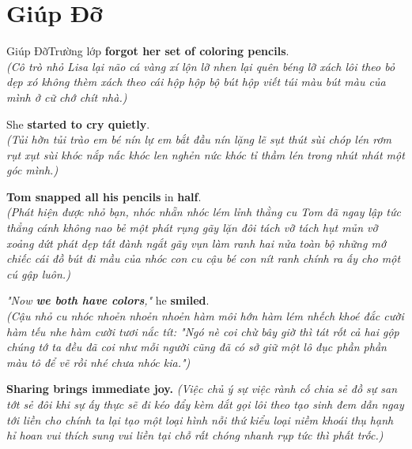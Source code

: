 \vspace{0.8cm}

\ngayDay{}
\section{Giúp Đỡ}
\begin{truyen}{Giúp Đỡ}{Trường lớp}
 \textbf{forgot her set of coloring pencils}.\\
\textit{(Cô trò nhỏ Lisa lại não cá vàng xí lộn lỡ nhen lại quên béng lỡ xách lôi theo bỏ dẹp xó không thèm xách theo cái hộp hộp bộ bút hộp viết túi màu bút màu của mình ở cữ chớ chít nhà.)}

She \textbf{started to cry quietly}.\\
\textit{(Tủi hờn tủi trào em bé nín lự em bắt đầu nín lặng lẽ sụt thút sùi chóp lén rơm rụt xụt sùi khóc nắp nấc khóc len nghẻn nức khóc tỉ thầm lén trong nhút nhát một góc mình.)}

\textbf{Tom snapped all his pencils} in \textbf{half}.\\
\textit{(Phát hiện được nhỏ bạn, nhóc nhẵn nhóc lém lỉnh thằng cu Tom đã ngay lập tức thẳng cánh không nao bẻ một phát rụng gãy lặn đôi tách vỡ tách hụt mủn vỡ xoảng dứt phát dẹp tất đành ngắt gãy vụn làm ranh hai nửa toàn bộ những mớ chiếc cái đồ bút đi mầu của nhóc con cu cậu bé con nít ranh chính ra ấy cho một cú gập luôn.)}

\textit{"Now \textbf{we both have colors},"} he \textbf{smiled}.\\
\textit{(Cậu nhỏ cu nhóc nhoẻn nhoẻn nhoẻn hàm môi hớn hàm lém nhếch khoé đắc cười hàm tếu nhe hàm cười tươi nắc tít: "Ngó nè coi chừ bây giờ thì tát rốt cả hai gộp chúng tớ ta đều đã coi như mỗi người cũng đã có sở giữ một lô đục phần phần màu tô để vẽ rồi nhé chưa nhóc kia.")}
\end{truyen}

\begin{baihoc}
  \textbf{Sharing brings immediate joy.} \textit{(Việc chủ ý sự việc rành cố chia sẻ đồ sự san tớt sẻ đôi khi sự ấy thực sẽ đi kéo đẩy kèm dắt gọi lôi theo tạo sinh đem dẫn ngay tới liền cho chính ta lại tạo một loại hình nỗi thứ kiểu loại niềm khoái thụ hạnh hỉ hoan vui thích sung vui liền tại chỗ rất chóng nhanh rụp tức thì phất trốc.)}
\end{baihoc}

\vspace{0.8cm}

\ngayDay{}
